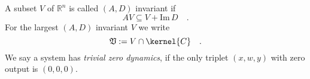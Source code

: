 \begin{definition}{}{}
	A subset $V$ of $\mathbb{R}^n$ is called $(A,D)$ invariant if
	\begin{equation}
	A V \subseteq V + \text{Im}\, D \quad .
	\end{equation}
	For the largest $(A,D)$ invariant $V$ we write
	\begin{equation}
	\mathfrak{V} := V \cap \kernel{C}\quad .
	\end{equation}
	We say a system has \textit{trivial zero dynamics}, if the only triplet $(x,w,y)$ with 
	zero output is $(0,0,0)$. 
\end{definition}
%
%	

